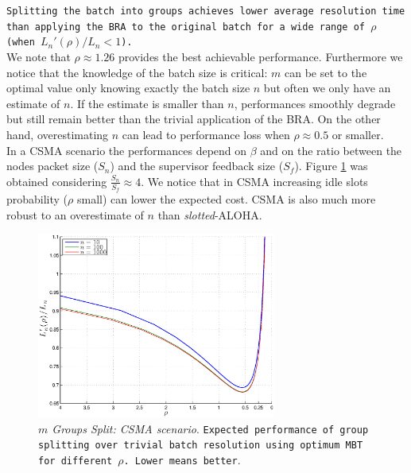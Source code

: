 \documentclass[11pt,a4paper,twoside,openright]{book}
\newcommand{\revv}[1]{{\tt#1}}
\begin{document}
\revv{Splitting the batch into groups achieves lower average resolution time than applying the BRA to the original batch for a wide range of $\rho$ (when $L_{n}'(\rho)/L_{n}<1$).}\\
We note that  $\rho\approx 1.26$ provides the best achievable performance. Furthermore we notice that the knowledge of the batch size is critical: $m$ can be set to the optimal value only knowing exactly the batch size $n$ but often we only have an estimate of $n$. If the estimate is smaller than $n$, performances smoothly degrade but still remain better than the trivial application of the BRA. On the other hand, overestimating $n$ can lead to performance loss when $\rho \approx 0.5$ or smaller.\\

In a CSMA scenario the performances depend on $\beta$ and on the ratio between the nodes packet size ($S_{n}$) and the supervisor feedback size ($S_{f}$). Figure \ref{m-groups-MBT-CSMA} was obtained considering $\displaystyle\frac{S_{n}}{S_{f}}\approx4$. We notice that in CSMA increasing idle slots probability ($\rho$ small) can lower the expected cost. CSMA is also much more robust to an overestimate of $n$ than \emph{slotted}-ALOHA.

\begin{figure}[H]
\begin{center}
\includegraphics[width=0.7\textwidth]{matlab/BTs/m-groups-MBT-CSMA}
\caption[$m$ Groups Split: CSMA scenario]{\emph{$m$ Groups Split: CSMA scenario}.  \revv{Expected performance of group splitting over trivial batch resolution using optimum MBT for different $\rho$. Lower means better}.}
\label{m-groups-MBT-CSMA}
\end{center}
\end{figure}
\end{document}
